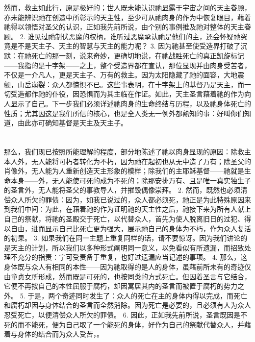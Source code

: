 然而，救主如此行，原是极好的；世人既未能认识祂显露于宇宙之间的天主眷顾，亦未能辨识祂在创造中所彰示的天主性，至少可从祂肉身的作为中恢复眼目，藉着祂得以领悟对圣父的认识，正如我先前所说，由个别的事例推及祂对整体的天主眷顾。 2. 谁见过祂制伏恶魔的权柄，谁听过恶魔承认祂是他们的主，还会怀疑祂究竟是不是天主子、天主的智慧与天主的能力呢？ 3. 因为祂甚至使受造界打破了沉默：在祂死亡的那一刻，说来奇妙，更确切地说，在祂战胜死亡的真正凯旋标记——我指的是十字架——之上，整个受造界都在宣认，那位显现并由肉身受苦者，不仅是一介凡人，更是天主子、万有的救主。因为太阳隐藏了祂的面容，大地震颤，山岳崩裂：众人都惊惧不已。这些事表明，在十字架上的基督乃是天主，而一切受造都作祂的仆役，因恐惧而为其主临在作证。如此，天主圣言藉着祂的作为向人显示了自己。下一步我们必须详述祂肉身的生命终结与历程，以及祂身体死亡的性质；尤其因这是我们所信的核心，也是全人类无一例外都熟知的事：好叫你们知道，由此亦可确知基督是天主及天主子。\par


\section{}

那么，我们现已按照所能理解的程度，部分地陈述了祂以肉身显现的原因：除救主本人外，无人能将可朽者转化为不朽，因为祂在起初也从无中造了万有；除圣父的肖像外，无人能为人重新创造天主形象的模样；除我们的主耶稣基督——祂就是生命本身——外，无人能使可死的成为不死的；除那安排万有、且是唯一真实独生子的圣言外，无人能将圣父的事教导人，并摧毁偶像崇拜。 2. 然而，既然也必须清偿众人所欠的罪债：因为，如我已说过的，众人都必须死，祂正是为此特殊原因来到我们中间：为此，在藉着祂的作为证明祂的天主性之后，祂接下来为所有人献上自己的祭献，将祂的圣殿交于死亡，以代替众人，首先为使人脱离旧日的过犯、得以自由，进而显示自己比死亡更为强大，展示祂自己的身体为不朽，作为众人复活的初果。 3. 如果我们在同一主题上重复同样的话，请不要惊讶。因为我们讲论的是天主的计划，所以我们以多种形式阐明同一意义，以免看似有所遗漏，而招致处理不充分的指责：宁可受责备于重复，也好过遗漏应当记述的事项。 4. 那么，这身体既与众人有相同的本性——因为祂取得的是人的身体，虽藉前所未有的奇迹仅由童贞女所形成，然而既是可死的，也按同类的方式死亡。但因着圣言与它结合，它便不再按自己的本性屈服于腐朽，却因寓居其内的圣言而被置于腐朽的势力之外。 5. 于是，两个奇迹同时发生了：众人的死亡在主的身体内得以完成，而死亡和腐朽却因与身体结合的圣言而全然消除。因为死亡是必要的，且必须有人为众人忍受死亡，以便清偿众人所欠的罪债。 6. 因此，正如我先前所说，圣言既因是不死的而不能死，便为自己取了一个能死的身体，好作为自己的祭献代替众人，并藉着与身体的结合而为众人受苦，。\par

